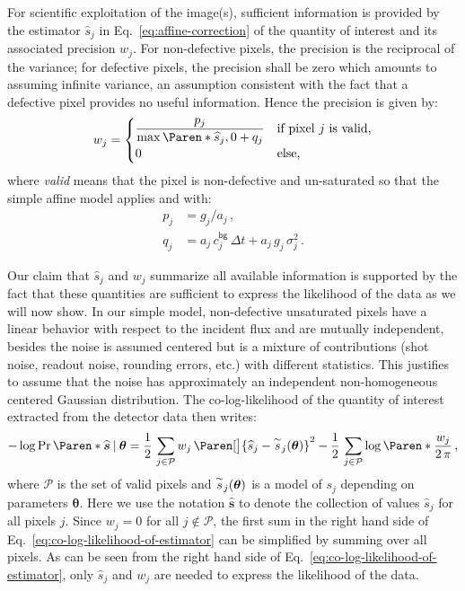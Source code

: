 \documentclass[a4paper,11pt,twoside]{scrartcl}
\newcommand*{\delimsize}{}
\newcommand*{\Given}{\:\delimsize\vert\:} %
\newcommand*{\Tag}[1]{\mathsf{#1}}
\newcommand*{\SIM}{\smash{\sim}}
\newcommand*{\proxy}[1]{\overset{\SIM}{#1}} %
\newcommand*{\estim}[1]{\widehat{#1}}
\newcommand*{\V}[1]{\boldsymbol{#1}}   %
\theoremstyle{plain} %
\theoremstyle{definition}
\theoremstyle{remark}
\begin{document}
For scientific exploitation of the image(s), sufficient information is provided
by the estimator $\estim{s}_j$ in Eq.~\eqref{eq:affine-correction} of the
quantity of interest and its associated precision $w_j$. For non-defective
pixels, the precision is the reciprocal of the variance; for defective pixels,
the precision shall be zero which amounts to assuming infinite variance, an
assumption consistent with the fact that a defective pixel provides no useful
information.  Hence the precision is given by:
\begin{equation}
  w_j = \begin{cases}
    \displaystyle \frac{p_j}{
      \max\Paren*{\estim{s}_j, 0} + q_j
    } & \text{if pixel $j$ is valid,} \\
    0 & \text{else,}
  \end{cases}
  \label{eq:precision-estimator}
\end{equation}
where \emph{valid} means that the pixel is non-defective and un-saturated so
that the simple affine model applies and with:
\begin{equation}
  \begin{aligned}
    p_j &= g_j/a_j \,, \\
    q_j &= a_j\,c^\Tag{bg}_j\,\Delta t + a_j\,g_j\,\sigma_j^2 \,.
  \end{aligned}
  \label{eq:precision-parameters}
\end{equation}

Our claim that $\estim{s}_j$ and $w_j$ summarize all available information is
supported by the fact that these quantities are sufficient to express the
likelihood of the data as we will now show.  In our simple model, non-defective
unsaturated pixels have a linear behavior with respect to the incident flux
and are mutually independent, besides the noise is assumed centered but is a
mixture of contributions (shot noise, readout noise, rounding errors, etc.)
with different statistics.  This justifies to assume that the noise has
approximately an independent non-homogeneous centered Gaussian distribution.
The co-log-likelihood of the quantity of interest extracted from the detector
data then writes:
\begin{equation}
  -\log\Pr\Paren*{\estim{\V s} \Given \V\theta} =
  \frac{1}{2}\,\sum_{j\in \mathcal{P}} w_j\,\Paren[\big]{\estim{s}_j - \proxy{s}_j(\V\theta)}^2 - \frac{1}{2}\,\sum_{j\in \mathcal{P}}\log\Paren*{\frac{w_j}{2\,\pi}} \, ,
  \label{eq:co-log-likelihood-of-estimator}
\end{equation}
where $\mathcal{P}$ is the set of valid pixels and $\proxy{s}_j(\V\theta)$ is a
model of $s_j$ depending on parameters $\V\theta$.  Here we use the notation
$\estim{\V s}$ to denote the collection of values $\estim{s}_j$ for all pixels
$j$.  Since $w_j = 0$ for all $j \not\in \mathcal{P}$, the first sum in the
right hand side of Eq.~\eqref{eq:co-log-likelihood-of-estimator} can be
simplified by summing over all pixels.  As can be seen from the right hand side
of Eq.~\eqref{eq:co-log-likelihood-of-estimator}, only $\estim{s}_j$ and $w_j$
are needed to express the likelihood of the data.
\end{document}
